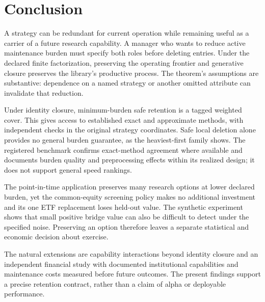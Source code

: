 \section{Conclusion}
\label{sec:conclusion}

A strategy can be redundant for current operation while remaining useful as a
carrier of a future research capability. A manager who wants to reduce active
maintenance burden must specify both roles before deleting entries. Under the
declared finite factorization, preserving the operating frontier and generative
closure preserves the library's productive process. The theorem's assumptions
are substantive: dependence on a named strategy or another omitted attribute
can invalidate that reduction.

Under identity closure, minimum-burden safe retention is a tagged weighted
cover. This gives access to established exact and approximate methods, with
independent checks in the original strategy coordinates. Safe local deletion
alone provides no general burden guarantee, as the heaviest-first family
shows. The registered benchmark confirms exact-method agreement where
available and documents burden quality and preprocessing effects within its
realized design; it does not support general speed rankings.

The point-in-time application preserves many research options at lower declared
burden, yet the common-equity screening policy makes no additional investment
and its one ETF replacement loses held-out value. The synthetic experiment
shows that small positive bridge value can also be difficult to detect under
the specified noise. Preserving an option therefore leaves a separate
statistical and economic decision about exercise.

The natural extensions are capability interactions beyond identity closure and
an independent financial study with documented institutional capabilities and
maintenance costs measured before future outcomes. The present findings support
a precise retention contract, rather than a claim of alpha or deployable
performance.
